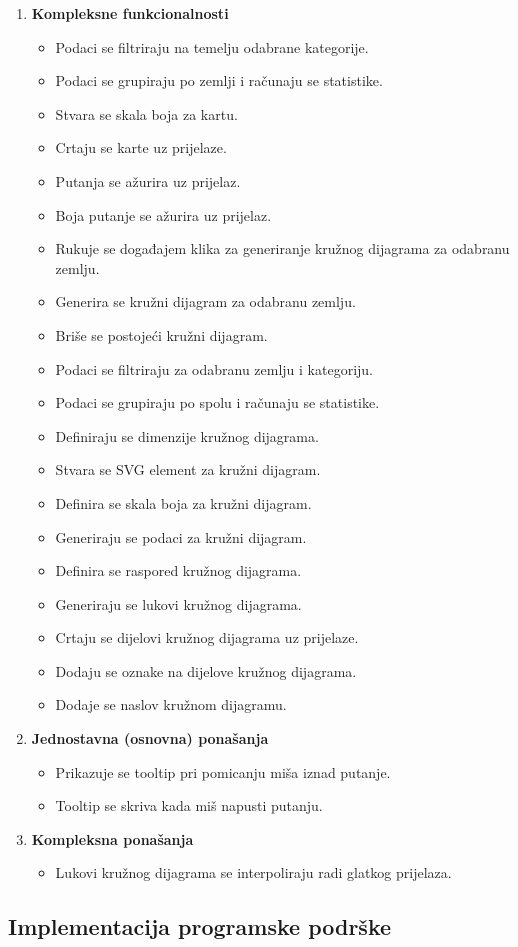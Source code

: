 \documentclass[12pt]{article}
\numberwithin{equation}{section}
\begin{document}
\begin{enumerate}[label=\arabic*.]
  \item \textbf{Kompleksne funkcionalnosti}
  \begin{itemize}
    \item Podaci se filtriraju na temelju odabrane kategorije.
    \item Podaci se grupiraju po zemlji i računaju se statistike.
    \item Stvara se skala boja za kartu.
    \item Crtaju se karte uz prijelaze.
    \item Putanja se ažurira uz prijelaz.
    \item Boja putanje se ažurira uz prijelaz.
    \item Rukuje se događajem klika za generiranje kružnog dijagrama za odabranu zemlju.
    \item Generira se kružni dijagram za odabranu zemlju.
    \item Briše se postojeći kružni dijagram.
    \item Podaci se filtriraju za odabranu zemlju i kategoriju.
    \item Podaci se grupiraju po spolu i računaju se statistike.
    \item Definiraju se dimenzije kružnog dijagrama.
    \item Stvara se SVG element za kružni dijagram.
    \item Definira se skala boja za kružni dijagram.
    \item Generiraju se podaci za kružni dijagram.
    \item Definira se raspored kružnog dijagrama.
    \item Generiraju se lukovi kružnog dijagrama.
    \item Crtaju se dijelovi kružnog dijagrama uz prijelaze.
    \item Dodaju se oznake na dijelove kružnog dijagrama.
    \item Dodaje se naslov kružnom dijagramu.
  \end{itemize}

  \item \textbf{Jednostavna (osnovna) ponašanja}
  \begin{itemize}
    \item Prikazuje se tooltip pri pomicanju miša iznad putanje.
    \item Tooltip se skriva kada miš napusti putanju.
  \end{itemize}

  \item \textbf{Kompleksna ponašanja}
  \begin{itemize}
    \item Lukovi kružnog dijagrama se interpoliraju radi glatkog prijelaza.
  \end{itemize}
\end{enumerate}
\subsection{Implementacija programske podrške}

\newpage
\newpage
\printbibliography
{}
\end{document}
